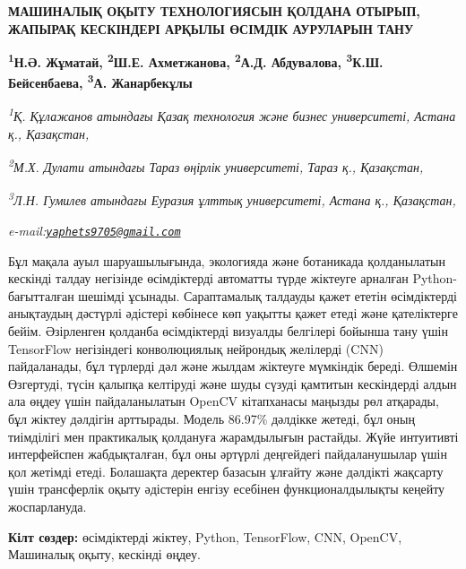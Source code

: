 \begin{articleheader}
{\bfseries МАШИНАЛЫҚ ОҚЫТУ ТЕХНОЛОГИЯСЫН ҚОЛДАНА ОТЫРЫП, ЖАПЫРАҚ КЕСКІНДЕРІ АРҚЫЛЫ ӨСІМДІК АУРУЛАРЫН ТАНУ}

{\bfseries
\textsuperscript{1}Н.Ә. Жұматай,
\textsuperscript{2}Ш.Е. Ахметжанова,
\textsuperscript{2}А.Д. Абдувалова,
\textsuperscript{3}К.Ш. Бейсенбаева,
\textsuperscript{3}А. Жанарбекұлы\textsuperscript{\envelope }}
\end{articleheader}

\begin{affiliation}
\emph{\textsuperscript{1}Қ. Құлажанов атындағы Қазақ технология және бизнес университеті, Астана қ., Қазақстан,}

\emph{\textsuperscript{2}М.Х. Дулати атындағы Тараз өңірлік университеті, Тараз қ., Қазақстан,}

\emph{\textsuperscript{3}Л.Н. Гумилев атындағы Еуразия ұлттық университеті, Астана қ., Қазақстан,}

\emph{e-mail:\href{mailto:yaphets9705@gmail.com}{\nolinkurl{yaphets9705@gmail.com}}}
\end{affiliation}

Бұл мақала ауыл шаруашылығында, экологияда және ботаникада қолданылатын
кескінді талдау негізінде өсімдіктерді автоматты түрде жіктеуге арналған
Python-бағытталған шешімді ұсынады. Сараптамалық талдауды қажет ететін
өсімдіктерді анықтаудың дәстүрлі әдістері көбінесе көп уақытты қажет
етеді және қателіктерге бейім. Әзірленген қолданба өсімдіктерді визуалды
белгілері бойынша тану үшін TensorFlow негізіндегі конволюциялық
нейрондық желілерді (CNN) пайдаланады, бұл түрлерді дәл және жылдам
жіктеуге мүмкіндік береді. Өлшемін Өзгертуді, түсін қалыпқа келтіруді
және шуды сүзуді қамтитын кескіндерді алдын ала өңдеу үшін
пайдаланылатын OpenCV кітапханасы маңызды рөл атқарады, бұл жіктеу
дәлдігін арттырады. Модель 86.97\% дәлдікке жетеді, бұл оның тиімділігі
мен практикалық қолдануға жарамдылығын растайды. Жүйе интуитивті
интерфейспен жабдықталған, бұл оны әртүрлі деңгейдегі пайдаланушылар
үшін қол жетімді етеді. Болашақта деректер базасын ұлғайту және дәлдікті
жақсарту үшін трансферлік оқыту әдістерін енгізу есебінен
функционалдылықты кеңейту жоспарлануда.

{\bfseries Кілт сөздер:} өсімдіктерді жіктеу, Python, TensorFlow, CNN,
OpenCV, Машиналық оқыту, кескінді өңдеу.

